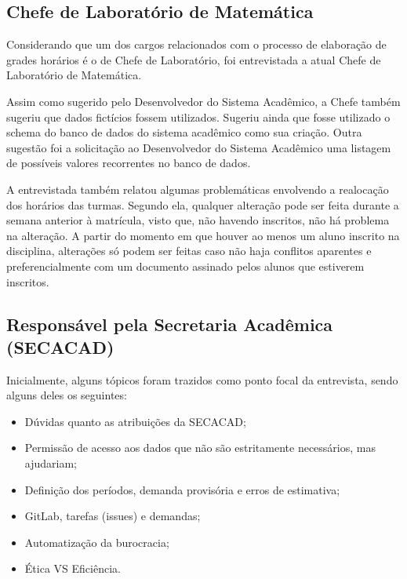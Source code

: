    \subsection{Chefe de Laboratório de Matemática} %

        Considerando que um dos cargos relacionados com o processo de elaboração de grades horários é o de Chefe de Laboratório, foi entrevistada a atual Chefe de Laboratório de Matemática.

        Assim como sugerido pelo Desenvolvedor do Sistema Acadêmico, a Chefe também sugeriu que dados fictícios fossem utilizados. Sugeriu ainda que fosse utilizado o schema do banco de dados do sistema acadêmico como sua criação. Outra sugestão foi a solicitação ao Desenvolvedor do Sistema Acadêmico uma listagem de possíveis valores recorrentes no banco de dados.

        A entrevistada também relatou algumas problemáticas envolvendo a realocação dos horários das turmas. Segundo ela, qualquer alteração pode ser feita durante a semana anterior à matrícula, visto que, não havendo inscritos, não há problema na alteração. A partir do momento em que houver ao menos um aluno inscrito na disciplina, alterações só podem ser feitas caso não haja conflitos aparentes e preferencialmente com um documento assinado pelos alunos que estiverem inscritos.

    \subsection{Responsável pela Secretaria Acadêmica (SECACAD)} %

        Inicialmente, alguns tópicos foram trazidos como ponto focal da entrevista, sendo alguns deles os seguintes:

        \begin{itemize}
            \item Dúvidas quanto as atribuições da SECACAD;
            \item Permissão de acesso aos dados que não são estritamente necessários, mas ajudariam;
            \item Definição dos períodos, demanda provisória e erros de estimativa;
            \item GitLab, tarefas (issues) e demandas;
            \item Automatização da burocracia;
            \item Ética VS Eficiência.
        \end{itemize}

